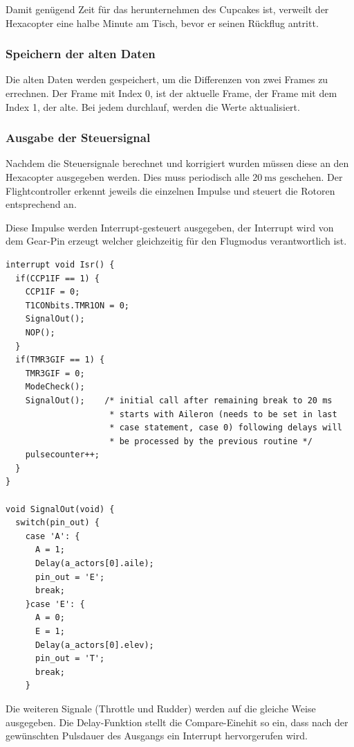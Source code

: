     Damit genügend Zeit für das herunternehmen des Cupcakes ist, verweilt der Hexacopter eine halbe Minute am Tisch, bevor er seinen Rückflug antritt.

    \subsubsection{Speichern der alten Daten}
    Die alten Daten werden gespeichert, um die Differenzen von zwei Frames zu errechnen. Der Frame mit Index 0, ist der aktuelle Frame, der Frame mit dem Index 1, der alte. Bei jedem durchlauf, werden die Werte aktualisiert.

    \subsubsection{Ausgabe der Steuersignal}
    Nachdem die Steuersignale berechnet und korrigiert wurden müssen diese an den Hexacopter ausgegeben werden. Dies muss periodisch alle $\SI{20}{\milli\second}$ geschehen.
    Der Flightcontroller erkennt jeweils die einzelnen Impulse und steuert die Rotoren entsprechend an.

    Diese Impulse werden Interrupt-gesteuert ausgegeben, der Interrupt wird von dem Gear-Pin erzeugt welcher gleichzeitig für den Flugmodus verantwortlich ist.

    \lstset{language = c}
    \begin{lstlisting}
interrupt void Isr() {
  if(CCP1IF == 1) {
    CCP1IF = 0;
    T1CONbits.TMR1ON = 0;
    SignalOut();
    NOP();
  }
  if(TMR3GIF == 1) {
    TMR3GIF = 0;
    ModeCheck();
    SignalOut();    /* initial call after remaining break to 20 ms
                     * starts with Aileron (needs to be set in last
                     * case statement, case 0) following delays will
                     * be processed by the previous routine */
    pulsecounter++;
  }
}

void SignalOut(void) {
  switch(pin_out) {
    case 'A': {
      A = 1;
      Delay(a_actors[0].aile);
      pin_out = 'E';
      break;
    }case 'E': {
      A = 0;
      E = 1;
      Delay(a_actors[0].elev);
      pin_out = 'T';
      break;
    }
    \end{lstlisting}
    Die weiteren Signale (Throttle und Rudder) werden auf die gleiche Weise ausgegeben.
    Die Delay-Funktion stellt die Compare-Einehit so ein, dass nach der gewünschten Pulsdauer des Ausgangs ein Interrupt hervorgerufen wird.

